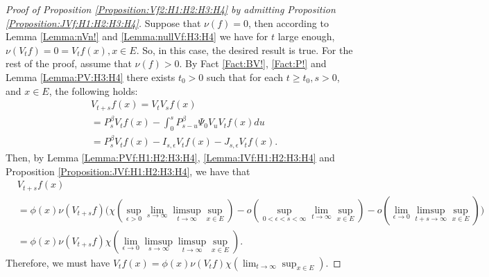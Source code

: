\documentclass[12pt,a4paper]{amsart}
\numberwithin{equation}{section}
\theoremstyle{plain}
\theoremstyle{definition}
\theoremstyle{remark}
\begin{document}
\begin{proof}[{Proof of Proposition \ref{Proposition:Vf2:H1:H2:H3:H4} by admitting Proposition \ref{Proposition:JVf:H1:H2:H3:H4}}]
Suppose that $\nu(f) = 0$, then according to Lemma \ref{Lemma:nVn!} and \ref{Lemma:nullVf:H3:H4} we have for $t$ large enough, $\nu(V_tf) =0= V_tf(x), x\in E$. 
So, in this case, the desired result is true. 
For the rest of the proof, assume that $\nu(f)>0$. 
By Fact \ref{Fact:BV!}, \ref{Fact:P!} and Lemma \ref{Lemma:PV:H3:H4} there exists $t_0> 0$ such that for each $t\geq t_0, s> 0$, and $x\in E$, the following holds:
\begin{align}
 &V_{t+s}f (x) 
 = V_t V_s f(x)
 \\&= P_s^\beta V_t f(x) - \int_0^s P^\beta_{s-u}\Psi_0 V_uV_t f(x) du 
 \\&= P_s^\beta V_t f(x) - I_{s,\epsilon} V_tf(x) - J_{s,\epsilon} V_t f(x).
 \end{align}
Then, by Lemma \ref{Lemma:PVf:H1:H2:H3:H4}, \ref{Lemma:IVf:H1:H2:H3:H4} and Proposition \ref{Proposition:JVf:H1:H2:H3:H4}, we have that
\begin{align}
 &V_{t+s}f (x) 
 \\&= \phi(x)\nu(V_{t+s}f) \Big( \chi(\sup_{\epsilon > 0}\lim_{s\to \infty} \limsup_{t\to \infty} \sup_{x\in E}) - o(\sup_{0<\epsilon < s<\infty} \lim_{t\to \infty}\sup_{x\in E}) - o(\lim_{\epsilon \to 0} \limsup_{t+s\to \infty} \sup_{x\in E})\Big)
 \\&= \phi(x) \nu(V_{t+s}f) \chi(\lim_{\epsilon\to 0} \limsup_{s\to \infty} \limsup_{t\to \infty} \sup_{x\in E}).
 \end{align}
Therefore, we must have $V_{t}f (x) = \phi(x) \nu (V_{t}f) \chi(\lim_{t\to \infty} \sup_{x\in E})$.
\end{proof}
\end{document}
